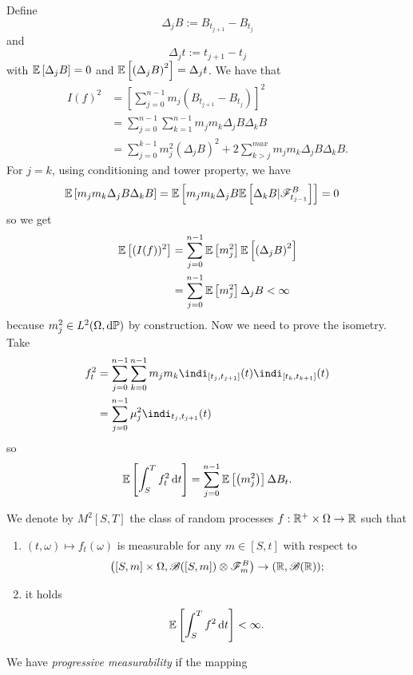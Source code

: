 \documentclass[12pt]{report}
\begin{document}
\begin{fancyproof}
	Define
	\begin{equation*}
		\Delta_{j}B:=B_{t_{j+1}}-B_{t_{j}}
	\end{equation*}
	and \begin{equation*}
		\Delta_{j}t:=t_{j+1}-t_{j}
	\end{equation*}
	with $\mathbb{E}\left[\Delta_{j}B\right]=0$ and $\mathbb{E}\left[\left(\Delta_{j}B\right)^{2}\right]=\Delta_{j}t$. We have that
	\begin{align*}
		I(f)^{2}&=\left[\sum_{j=0}^{n-1}m_{j}(B_{t_{j+1}}-B_{t_{j}})\right]^{2}\\
		&=\sum_{j=0}^{n-1}\sum_{k=1}^{n-1}m_{j}m_{k}\Delta_{j}B\Delta_{k}B\\
		&=\sum_{j=0}^{k-1}m^{2}_{j}\left(\Delta_{j}B\right)^{2}+2\sum_{k>j}^{max}m_{j}m_{k}\Delta_{j}B\Delta_{k}B.
	\end{align*}
	For $j=k$, using conditioning and tower property, we have
	\begin{align*}
		\mathbb{E}\left[m_{j}m_{k}\Delta_{j}B\Delta_{k}B\right]&=\mathbb{E}\left[m_{j}m_{k}\Delta_{j}B\mathbb{E}\left[\Delta_{k}B|\mathscr{F}^{B}_{t_{j-1}}\right]\right]=0
	\end{align*}
	so we get
	\begin{align*}
		\mathbb{E}\left[(I(f))^{2}\right]&=\sum_{j=0}^{n-1}\mathbb{E}\left[m_{j}^{2}\right]\mathbb{E}\left[\left(\Delta_{j}B\right)^{2}\right]\\
		&=\sum_{j=0}^{n-1}\mathbb{E}\left[m_{j}^{2}\right]\Delta_{j}B<\infty
	\end{align*}
	because $m^{2}_{j}\in L^{2}(\Omega,\mathop{}\!\mathrm{d}\mathbb{P})$ by construction. Now we need to prove the isometry. Take
	\begin{align*}
		f^{2}_{t}&=\sum_{j=0}^{n-1}\sum_{k=0}^{n-1}m_{j}m_{k}\indi_{[t_{j},t_{j+1}]}(t)\indi_{[t_{k},t_{k+1}]}(t)\\
		&=\sum_{j=0}^{n-1}\mu_{j}^{2}\indi_{t_{j},t_{j+1}}(t)
	\end{align*}
	so 
	\begin{equation*}
		\mathbb{E}\left[\int_{S}^{T}f_{t}^{2}\mathop{}\!\mathrm{d} t\right]=\sum_{j=0}^{n-1}\mathbb{E}\left[\left(m^{2}_{j}\right)\right]\Delta B_{t}.
	\end{equation*}
\end{fancyproof}
\begin{definition}
	We denote by $M^{2}[S,T]$ the class of random processes $f:\mathbb{R}^{+}\times\Omega\to\mathbb{R}$ such that
	\begin{enumerate}
		\item $(t,\omega)\mapsto f_{t}(\omega)$ is measurable for any $m\in[S,t]$ with respect to
		\begin{equation*}
			\left([S,m]\times\Omega,\mathscr{B}([S,m])\otimes\mathscr{F}^{B}_{m}\right)\to(\mathbb{R},\mathscr{B}(\mathbb{R}));
		\end{equation*}
		\item it holds
		\begin{equation*}
			\mathbb{E}\left[\int_{S}^{T}f^{2}\mathop{}\!\mathrm{d} t\right]<\infty.
		\end{equation*}
	\end{enumerate}
\end{definition} We have \emph{progressive measurability} if the mapping
\end{document}
